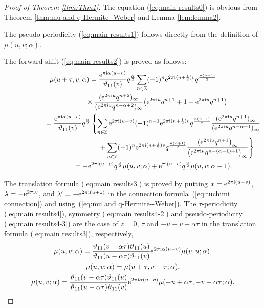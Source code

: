 \documentclass[pdftex]{sigma}
\numberwithin{equation}{section}
\theoremstyle{definition}
\newcommand{\Zz}{\mathbb{Z}}
\begin{document}
\begin{proof}[Proof of Theorem \ref{thm:Thm1}]
The equation (\ref{eq:main results0}) is obvious from Theorem \ref{thm:mu and q-Hermite--Weber} and Lemma \ref{lem:lemma2}.

The pseudo periodicity (\ref{eq:main results1}) follows directly from the definition of $\mu(u,v;\alpha)$.

The forward shift (\ref{eq:main results2}) is proved as follows:
\begin{gather*}
\mu(u+\tau,v;\alpha)
 =
 \frac{{\rm e}^{\pi{\rm i}\alpha(u-v)}}{\vartheta_{11}(v)}q^\frac{\alpha}{2}\sum_{n\in\Zz}
 (-1)^n{\rm e}^{2\pi{\rm i}(n+\frac{1}{2})v}q^\frac{n(n+1)}{2} \\
\hphantom{\mu(u+\tau,v;\alpha)=}{}\times
 \frac{({\rm e}^{2\pi{\rm i}u}q^{n+2})_{\infty }}{({\rm e}^{2\pi{\rm i}u}q^{n-\alpha+2})_{\infty }}\big({\rm e}^{2\pi{\rm i}u}q^{n+1}+1-{\rm e}^{2\pi{\rm i}u}q^{n+1}\big) \\
\hphantom{\mu(u+\tau,v;\alpha)}{}=
 \frac{{\rm e}^{\pi{\rm i}\alpha(u-v)}}{\vartheta_{11}(v)}q^\frac{\alpha}{2}
 \left\{
 \sum_{n\in\Zz}{\rm e}^{2\pi{\rm i}(u-v)}(-1)^{n-1}{\rm e}^{2\pi{\rm i}(n+\frac{1}{2})v}q^\frac{n(n+1)}{2}
 \frac{({\rm e}^{2\pi{\rm i}u}q^{n+1})_{\infty }}{({\rm e}^{2\pi{\rm i}u}q^{n-\alpha+1})_{\infty }} \right. \\
 \left.
 \hphantom{\mu(u+\tau,v;\alpha)=\frac{{\rm e}^{\pi{\rm i}\alpha(u-v)}}{\vartheta_{11}(v)}q^\frac{\alpha}{2}}{}
 +
 \sum_{n\in\Zz}(-1)^n{\rm e}^{2\pi{\rm i}(n+\frac{1}{2})v}q^\frac{n(n+1)}{2}
 \frac{\big({\rm e}^{2\pi{\rm i}u}q^{n+1}\big)_{\infty }}{\big({\rm e}^{2\pi{\rm i}u}q^{n-(\alpha -1)+1}\big)_{\infty }}\right\} \\
 \hphantom{\mu(u+\tau,v;\alpha)}{}
 =
 -{\rm e}^{2\pi{\rm i}(u-v)}q^\frac{\alpha}{2}\mu(u,v;\alpha)+{\rm e}^{\pi{\rm i}(u-v)}q^\frac{\alpha}{2}\mu(u,v;\alpha-1).
\end{gather*}

The translation formula (\ref{eq:main results3}) is proved by putting $x={\rm e}^{2\pi{\rm i}(u-v)}$, $\lambda=-{\rm e}^{2\pi{\rm i}v}$, and $\lambda^{\prime}=-{\rm e}^{2\pi{\rm i}(u+z)}$ in the connection formula~(\ref{eq:tuchimi connection}) and using~(\ref{eq:mu and q-Hermite--Weber}).
The $\tau$-periodicity (\ref{eq:main results4}), symmetry (\ref{eq:main results4-2}) and pseudo-periodicity (\ref{eq:main results4-3}) are the case of $z=0$, $\tau$ and $-u-v+\alpha\tau$ in the translation formula (\ref{eq:main results3}), respectively,
\begin{gather*}
\mu(u,v;\alpha)
 =
 \frac{\vartheta_{11}(v-\alpha\tau)\vartheta_{11}(u)}{\vartheta_{11}(u-\alpha\tau)\vartheta_{11}(v)}{\rm e}^{2\pi{\rm i}\alpha(u-v)}\mu(v,u;\alpha), \\
\mu(u,v;\alpha)
 =
 \mu(u+\tau,v+\tau;\alpha), \\
\mu(u,v;\alpha)
 =
 \frac{\vartheta_{11}(v-\alpha\tau)\vartheta_{11}(u)}{\vartheta_{11}(u-\alpha\tau)\vartheta_{11}(v)}{\rm e}^{2\pi{\rm i}\alpha(u-v)}\mu(-u+\alpha\tau,-v+\alpha\tau;\alpha).
\end{gather*}


\end{proof}
\end{document}
